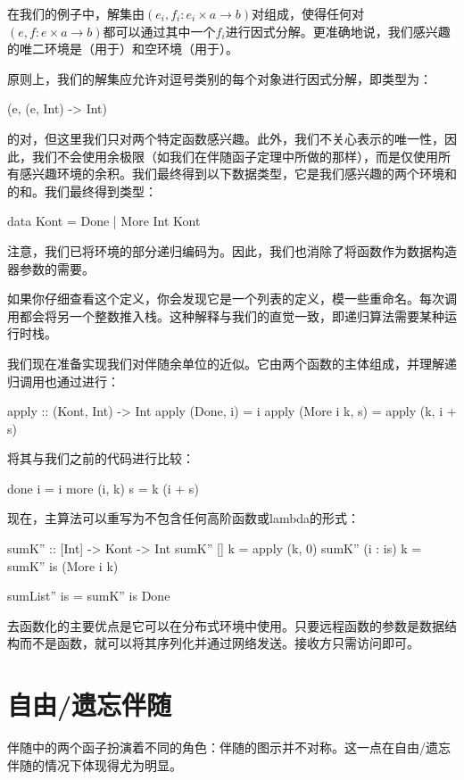 \documentclass[DaoFP]{subfiles}
\begin{document}
在我们的例子中，解集由$(e_i, f_i \colon e_i \times a \to b)$对组成，使得任何对$(e, f \colon e \times a \to b)$都可以通过其中一个$f_i$进行因式分解。更准确地说，我们感兴趣的唯二环境是（用于）和空环境\hask{()}（用于）。

原则上，我们的解集应允许对逗号类别的每个对象进行因式分解，即类型为：
\begin{haskell}
(e, (e, Int) -> Int)
\end{haskell}
的对，但这里我们只对两个特定函数感兴趣。此外，我们不关心表示的唯一性，因此，我们不会使用余极限（如我们在伴随函子定理中所做的那样），而是仅使用所有感兴趣环境的余积。我们最终得到以下数据类型，它是我们感兴趣的两个环境\hask{()}和的和。我们最终得到类型：
\begin{haskell}
data Kont = Done | More Int Kont
\end{haskell}
注意，我们已将环境的部分递归编码为。因此，我们也消除了将函数作为数据构造器参数的需要。

如果你仔细查看这个定义，你会发现它是一个列表的定义，模一些重命名。每次调用都会将另一个整数推入栈。这种解释与我们的直觉一致，即递归算法需要某种运行时栈。

我们现在准备实现我们对伴随余单位的近似。它由两个函数的主体组成，并理解递归调用也通过进行：
\begin{haskell}
apply :: (Kont, Int) -> Int
apply (Done, i) = i
apply (More i k, s) = apply (k, i + s)
\end{haskell}
将其与我们之前的代码进行比较：
\begin{haskell}
done i = i
more (i, k) s = k (i + s)
\end{haskell}

现在，主算法可以重写为不包含任何高阶函数或lambda的形式：
\begin{haskell}
sumK'' :: [Int] -> Kont -> Int
sumK'' [] k = apply (k, 0)
sumK'' (i : is) k = sumK'' is (More i k)
\end{haskell}

\begin{haskell}
sumList'' is = sumK'' is Done
\end{haskell}

去函数化的主要优点是它可以在分布式环境中使用。只要远程函数的参数是数据结构而不是函数，就可以将其序列化并通过网络发送。接收方只需访问即可。

\section{自由/遗忘伴随}
伴随中的两个函子扮演着不同的角色：伴随的图示并不对称。这一点在自由/遗忘伴随的情况下体现得尤为明显。
\end{document}
